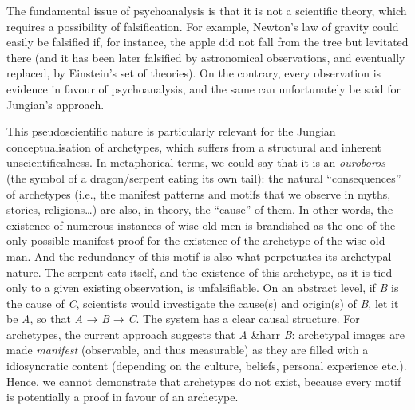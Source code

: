 \documentclass[]{book}
\begin{document}
The fundamental issue of psychoanalysis is that it is not a scientific theory, which requires a possibility of falsification. For example, Newton's law of gravity could easily be falsified if, for instance, the apple did not fall from the tree but levitated there (and it has been later falsified by astronomical observations, and eventually replaced, by Einstein's set of theories). On the contrary, every observation is evidence in favour of psychoanalysis, and the same can unfortunately be said for Jungian's approach.

This pseudoscientific nature is particularly relevant for the Jungian conceptualisation of archetypes, which suffers from a structural and inherent unscientificalness. In metaphorical terms, we could say that it is an \emph{ouroboros} (the symbol of a dragon/serpent eating its own tail): the natural ``consequences'' of archetypes (i.e., the manifest patterns and motifs that we observe in myths, stories, religions\ldots) are also, in theory, the ``cause'' of them. In other words, the existence of numerous instances of wise old men is brandished as the one of the only possible manifest proof for the existence of the archetype of the wise old man. And the redundancy of this motif is also what perpetuates its archetypal nature. The serpent eats itself, and the existence of this archetype, as it is tied only to a given existing observation, is unfalsifiable. On an abstract level, if \emph{B} is the cause of \emph{C}, scientists would investigate the cause(s) and origin(s) of \emph{B}, let it be \emph{A}, so that \emph{A} → \emph{B} → \emph{C}. The system has a clear causal structure. For archetypes, the current approach suggests that \emph{A} \&harr \emph{B}: archetypal images are made \emph{manifest} (observable, and thus measurable) as they are filled with a idiosyncratic content (depending on the culture, beliefs, personal experience etc.). Hence, we cannot demonstrate that archetypes do not exist, because every motif is potentially a proof in favour of an archetype.
\end{document}
